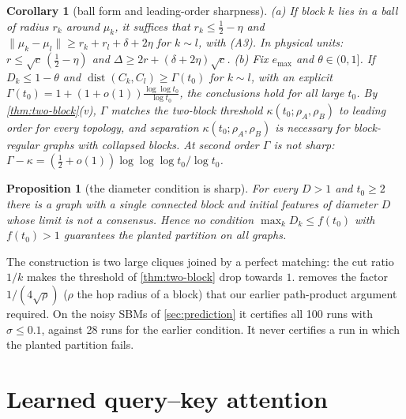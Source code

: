 \documentclass[10pt]{article}
\newtheorem{proposition}{Proposition}
\newtheorem{corollary}{Corollary}
\theoremstyle{definition}
\theoremstyle{remark}
\newcommand{\dist}{\operatorname{dist}}
\begin{document}
\begin{corollary}[ball form and leading-order sharpness]\label{cor:planted}
(a) If block $k$ lies in a ball of radius $r_k$ around $\mu_k$, it suffices that $r_k\le\frac12-\eta$ and
$\|\mu_k-\mu_l\|\ge r_k+r_l+\delta+2\eta$ for $k\sim l$, with (A3). In physical units: $r\le\sqrt c\,(\frac12-\eta)$ and
$\Delta\ge2r+(\delta+2\eta)\sqrt c$.
(b) Fix $e_{\max}$ and $\theta\in(0,1]$. If $D_k\le1-\theta$ and $\dist(C_k,C_l)\ge\Gamma(t_0)$ for $k\sim l$, with an explicit
$\Gamma(t_0)=1+(1+o(1))\frac{\log\log t_0}{\log t_0}$, the conclusions hold for all large $t_0$. By \cref{thm:two-block}(v), $\Gamma$ matches the
two-block threshold $\kappa(t_0;\rho_A,\rho_B)$ to leading order for every topology, and separation $\kappa(t_0;\rho_A,\rho_B)$ is necessary
for block-regular graphs with collapsed blocks. At second order $\Gamma$ is not sharp: $\Gamma-\kappa=(\frac12+o(1))\log\log\log t_0/\log t_0$.
\end{corollary}

\begin{proposition}[the diameter condition is sharp]\label{prop:sharp}
For every $D>1$ and $t_0\ge2$ there is a graph with a single connected block and initial features of diameter $D$ whose limit is not a
consensus. Hence no condition $\max_kD_k\le f(t_0)$ with $f(t_0)>1$ guarantees the planted partition on all graphs.
\end{proposition}

The construction is two large cliques joined by a perfect matching: the cut ratio $1/k$ makes the threshold of \cref{thm:two-block} drop
towards $1$.  removes the factor $1/(4\sqrt\rho)$ ($\rho$ the hop radius of a block) that our earlier path-product
argument required. On the noisy SBMs of \cref{sec:prediction} it certifies all 100 runs with $\sigma\le0.1$, against 28 runs for the earlier
condition. It never certifies a run in which the planted partition fails.

\section{Learned query--key attention}\label{sec:learned}
\end{document}
